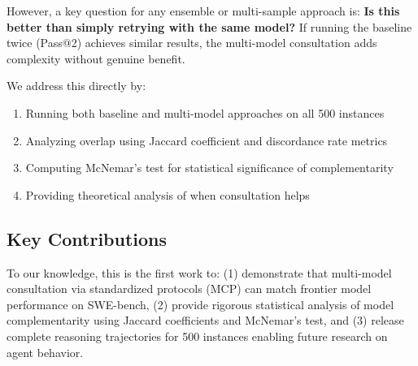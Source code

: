 \documentclass[11pt,a4paper]{article}
\begin{document}
However, a key question for any ensemble or multi-sample approach is: \textbf{Is this better than simply retrying with the same model?} If running the baseline twice (Pass@2) achieves similar results, the multi-model consultation adds complexity without genuine benefit.

We address this directly by:
\begin{enumerate}
    \item Running both baseline and multi-model approaches on all 500 instances
    \item Analyzing overlap using Jaccard coefficient and discordance rate metrics
    \item Computing McNemar's test for statistical significance of complementarity
    \item Providing theoretical analysis of when consultation helps
\end{enumerate}

\subsection{Key Contributions}

To our knowledge, this is the first work to: (1) demonstrate that multi-model consultation via standardized protocols (MCP) can match frontier model performance on SWE-bench, (2) provide rigorous statistical analysis of model complementarity using Jaccard coefficients and McNemar's test, and (3) release complete reasoning trajectories for 500 instances enabling future research on agent behavior.
\end{document}
